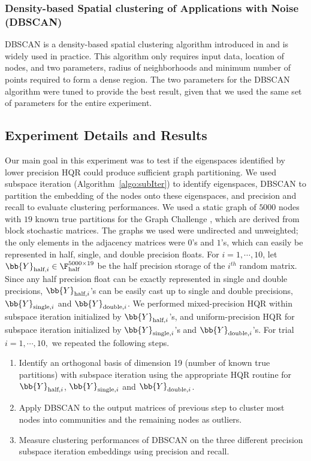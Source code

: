 \subsubsection{Density-based Spatial clustering of Applications with Noise (DBSCAN)}
DBSCAN is a density-based spatial clustering algorithm introduced in \cite{EKSX1996} and is widely used in practice.
This algorithm only requires input data, location of nodes, and two parameters, radius of neighborhoods and minimum number of points required to form a dense region. 
The two parameters for the DBSCAN algorithm were tuned to provide the best result, given that we used the same set of parameters for the entire experiment.

\subsection{Experiment Details and Results}
Our main goal in this experiment was to test if the eigenspaces identified by lower precision HQR could produce sufficient graph partitioning. 
We used subspace iteration (Algorithm~\ref{algo:subIter}) to identify eigenspaces, DBSCAN to partition the embedding of the nodes onto these eigenspaces, and precision and recall to evaluate clustering performances. 
We used a static graph of $5000$ nodes  with $19$ known true partitions for the Graph Challenge \cite{GraphChallenge}, which are derived from block stochastic matrices. 
The graphs we used were undirected and unweighted; the only elements in the adjacency matrices were $0$'s and $1$'s, which can easily be represented in half, single, and double precision floats. 
For $i=1, \cdots, 10$, let $\bb{Y}_{\text{half},i}\in\F_{\text{half}}^{5000\times 19}$ be the half precision storage of the $i^{th}$ random matrix.
Since any half precision float can be exactly represented in single and double precisions, $\bb{Y}_{\text{half},i}$'s can be easily cast up to single and double precisions, $\bb{Y}_{\text{single},i}$ and $\bb{Y}_{\text{double},i}$.
We performed mixed-precision HQR within subspace iteration initialized by $\bb{Y}_{\text{half},i}$'s, and uniform-precision HQR for subspace iteration initialized by $\bb{Y}_{\text{single},i}$'s  and $\bb{Y}_{\text{double},i}$'s.
For trial $i = 1, \cdots, 10, $ we repeated the following steps.
\begin{enumerate}[Step 1.]
	\item Identify an orthogonal basis of dimension 19 (number of known true partitions) with subspace iteration using the appropriate HQR routine for $\bb{Y}_{\text{half},i}$, $\bb{Y}_{\text{single},i}$ and $\bb{Y}_{\text{double},i}$.
	\item Apply DBSCAN to the output matrices of previous step to cluster most nodes into communities and the remaining nodes as outliers. 
	\item Measure clustering performances of DBSCAN on the three different precision subspace iteration embeddings using precision and recall.
\end{enumerate}

